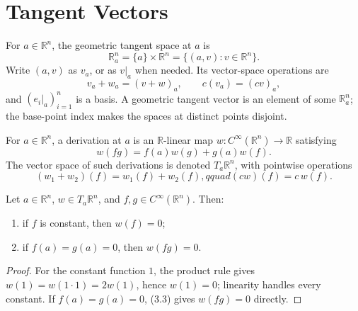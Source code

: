 

\section{Tangent Vectors}

\begin{definition}
\label{def:3-13-extra-1}
\leanok
For $a\in\mathbb{R}^n$, the geometric tangent space at $a$ is
\[
\mathbb{R}^n_a=\{a\}\times\mathbb{R}^n
  =\{(a,v):v\in\mathbb{R}^n\}.
\]
Write $(a,v)$ as $v_a$, or as $v|_a$ when needed. Its vector-space operations are
\[
v_a+w_a=(v+w)_a,\qquad c(v_a)=(cv)_a,
\]
and $(e_i|_a)_{i=1}^n$ is a basis. A geometric tangent vector is an element of
some $\mathbb{R}^n_a$; the base-point index makes the spaces at distinct points
disjoint.
\end{definition}

\begin{definition}
\label{def:3-13-extra-2}
\mathlibok
For $a\in\mathbb{R}^n$, a derivation at $a$ is an $\mathbb{R}$-linear map
$w:C^\infty(\mathbb{R}^n)\to\mathbb{R}$ satisfying
\[
w(fg)=f(a)w(g)+g(a)w(f). \tag{3.3}
\]
The vector space of such derivations is denoted $T_a\mathbb{R}^n$, with
pointwise operations
\[
(w_1+w_2)(f)=w_1(f)+w_2(f),qquad (cw)(f)=c\,w(f).
\]
\end{definition}

\begin{lemma}
\label{lem:3-1}
\leanok
{}
Let $a\in\mathbb{R}^n$, $w\in T_a\mathbb{R}^n$, and
$f,g\in C^\infty(\mathbb{R}^n)$. Then:
\begin{enumerate}
\item if $f$ is constant, then $w(f)=0$;
\item if $f(a)=g(a)=0$, then $w(fg)=0$.
\end{enumerate}
\end{lemma}

\begin{proof}
\leanok
\sketch
For the constant function $1$, the product rule gives
$w(1)=w(1\cdot1)=2w(1)$, hence $w(1)=0$; linearity handles every constant.
If $f(a)=g(a)=0$, (3.3) gives $w(fg)=0$ directly.
\end{proof}

